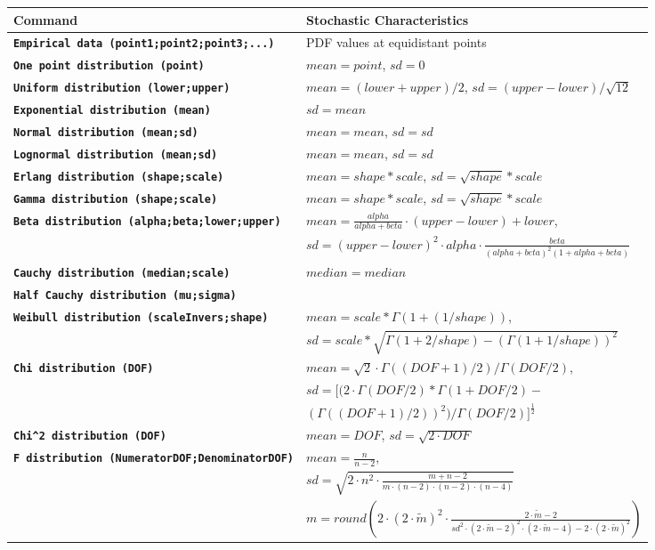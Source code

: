 \documentclass{svmono}
\def\cm#1{\textbf{\texttt{#1}}}
\begin{document}
{
\renewcommand{\arraystretch}{1.15}\scriptsize
\begin{longtable}{l|l}
\textbf{Command} & \textbf{Stochastic Characteristics} \\ \hline
\cm{Empirical data (point1;point2;point3;...)} & PDF values at equidistant points \\
\cm{One point distribution (point)} & $mean = point$, $sd = 0$ \\
\cm{Uniform distribution (lower;upper)} & $mean = (lower+upper)/2$, $sd = (upper-lower)/\sqrt{12}$ \\
\cm{Exponential distribution (mean)} & $sd = mean$ \\
\cm{Normal distribution (mean;sd)} & $mean = mean$, $sd = sd$ \\
\cm{Lognormal distribution (mean;sd)} & $mean = mean$, $sd = sd$ \\
\cm{Erlang distribution (shape;scale)} & $mean = shape*scale$, $sd = \sqrt{shape}*scale$ \\
\cm{Gamma distribution (shape;scale)} & $mean = shape*scale$, $sd = \sqrt{shape}*scale$ \\
\cm{Beta distribution (alpha;beta;lower;upper)} & $mean = \frac{alpha}{alpha+beta}\cdot(upper-lower)+lower$,\\
~& $sd = (upper-lower)^2\cdot alpha\cdot \frac{beta}{(alpha+beta)^2(1+alpha+beta)}$ \\
\cm{Cauchy distribution (median;scale)} & $median = median$ \\
\cm{Half Cauchy distribution (mu;sigma)} & ~ \\
\cm{Weibull distribution (scaleInvers;shape)} & $mean = scale*\Gamma(1+(1/shape))$,\\
~ & $sd = scale*\sqrt{\Gamma(1+2/shape)-(\Gamma(1+1/shape))^2}$ \\
\cm{Chi distribution (DOF)} & $mean = \sqrt{2}\cdot\Gamma((DOF+1)/2)/\Gamma(DOF/2)$,\\
~ & $sd = \Big[(2\cdot\Gamma(DOF/2)*\Gamma(1+DOF/2)-$\\
~ & $(\Gamma((DOF+1)/2))^2)/\Gamma(DOF/2)\Big]^{\frac{1}{2}}$ \\
\cm{Chi\^{}2 distribution (DOF)} & $mean = DOF$, $sd = \sqrt{2\cdot DOF}$ \\
\cm{F distribution (NumeratorDOF;DenominatorDOF)} & $mean = \frac{n}{n-2}$,\\
~ & $sd = \sqrt{2\cdot n^2\cdot\frac{m+n-2}{m\cdot(n-2)\cdot(n-2)\cdot(n-4)}}$ \\
~ & $m = round\left(2\cdot (2\cdot\widetilde m)^2\cdot\frac{2\cdot\widetilde m-2}{sd^2\cdot (2\cdot\widetilde m-2)^2\cdot (2\cdot\widetilde m-4)-2\cdot (2\cdot\widetilde m)^2}\right)$\\

\end{longtable}}
\end{document}
